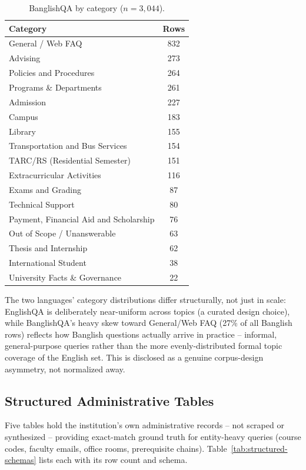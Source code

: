 \documentclass[a4paper,twoside]{article}
\begin{document}
\begin{table}[h]
\caption{BanglishQA by category ($n=3{,}044$).}\label{tab:banglishqa-categories}\centering
\begin{tabular}{|l|c|}
\hline
Category & Rows \\
\hline
General / Web FAQ & 832 \\
Advising & 273 \\
Policies and Procedures & 264 \\
Programs \& Departments & 261 \\
Admission & 227 \\
Campus & 183 \\
Library & 155 \\
Transportation and Bus Services & 154 \\
TARC/RS (Residential Semester) & 151 \\
Extracurricular Activities & 116 \\
Exams and Grading & 87 \\
Technical Support & 80 \\
Payment, Financial Aid and Scholarship & 76 \\
Out of Scope / Unanswerable & 63 \\
Thesis and Internship & 62 \\
International Student & 38 \\
University Facts \& Governance & 22 \\
\hline
\end{tabular}
\end{table}

The two languages' category distributions differ structurally, not just in scale: EnglishQA is deliberately near-uniform across topics (a curated design choice), while BanglishQA's heavy skew toward General/Web FAQ (27\% of all Banglish rows) reflects how Banglish questions actually arrive in practice -- informal, general-purpose queries rather than the more evenly-distributed formal topic coverage of the English set. This is disclosed as a genuine corpus-design asymmetry, not normalized away.

\subsection{Structured Administrative Tables}
\label{subsec:structured-tables}

Five tables hold the institution's own administrative records -- not scraped or synthesized -- providing exact-match ground truth for entity-heavy queries (course codes, faculty emails, office rooms, prerequisite chains). Table~\ref{tab:structured-schemas} lists each with its row count and schema.
\end{document}
